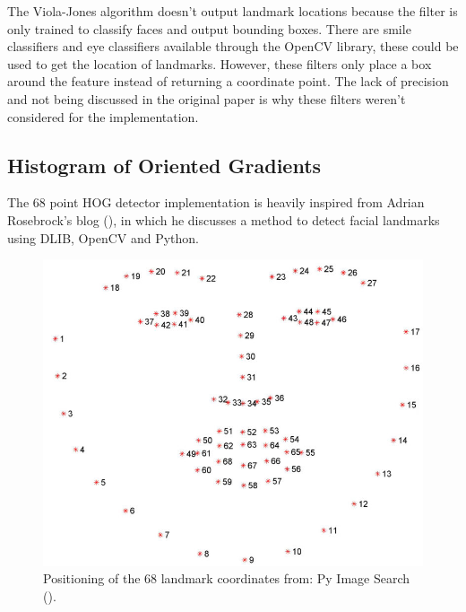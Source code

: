 \documentclass{l4proj}
\begin{document}
The Viola-Jones algorithm doesn't output landmark locations because the filter is only trained to classify faces and output bounding boxes. There are smile classifiers and eye classifiers available through the OpenCV library, these could be used to get the location of landmarks. However, these filters only place a box around the feature instead of returning a coordinate point. The lack of precision and not being discussed in the original paper is why these filters weren't considered for the implementation.
\subsection{Histogram of Oriented Gradients}
The 68 point HOG detector implementation is heavily inspired from Adrian Rosebrock's blog (\cite{68p}), in which he discusses a method to detect facial landmarks using DLIB, OpenCV and Python.
\begin{figure}[h!]
  \centering
  \begin{minipage}{0.5\textwidth}
    \includegraphics[width=\textwidth]{images/68point.jpg}
    \caption{Positioning of the 68 landmark coordinates from: Py Image Search (\cite{68p}).}
    \label{68p}
  \end{minipage}
  \hfill
\end{figure}
\end{document}
